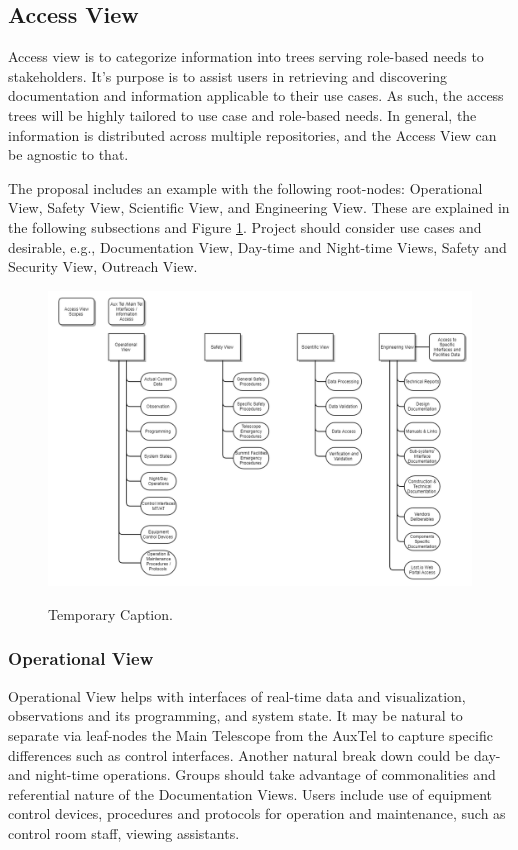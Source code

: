 \subsection{Access View}
\label{sec:access-view}

Access view is to categorize information into trees serving role-based needs to stakeholders.
It's purpose is to assist users in retrieving and discovering documentation and information applicable to their use cases.
As such, the access trees will be highly tailored to use case and role-based needs.
In general, the information is distributed across multiple repositories, and the Access View can be agnostic to that.

The proposal includes an example with the following root-nodes: Operational View, Safety View, Scientific View, and Engineering View.
These are explained in the following subsections and Figure \ref{fig:access-view-example}.
Project should consider use cases and desirable, e.g., Documentation View, Day-time and Night-time Views, Safety and Security View, Outreach View.

\begin{figure}[ht]
\caption{Temporary Caption.}
\centering
\includegraphics[width=\textwidth]{access-view-example-temp}
\label{fig:access-view-example}
\end{figure}

\subsubsection{Operational View}

Operational View helps with interfaces of real-time data and visualization, observations and its programming, and system state.
It may be natural to separate via leaf-nodes the Main Telescope from the AuxTel to capture specific differences such as control interfaces.
Another natural break down could be day- and night-time operations.
Groups should take advantage of commonalities and referential nature of the Documentation Views.
Users include use of equipment control devices, procedures and protocols for operation and maintenance, such as control room staff, viewing assistants.

